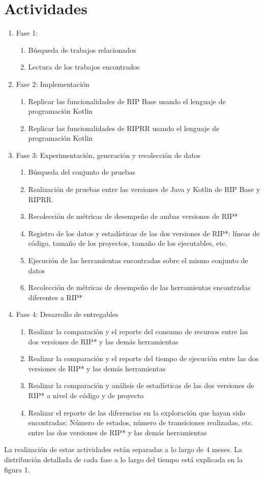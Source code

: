 \documentclass[conference]{IEEEtran}
\begin{document}
\section{Actividades}
	\begin{enumerate}
		\item Fase 1: 
		\begin{enumerate}
			\item Búsqueda de trabajos relacionados
			\item Lectura de los trabajos encontrados
		\end{enumerate}
		\item Fase 2: Implementación
		\begin{enumerate}
			\item Replicar las funcionalidades de RIP Base usando el lenguaje de programación Kotlin
			\item Replicar las funcionalidades de RIPRR usando el lenguaje de programación Kotlin
		\end{enumerate}
		\item Fase 3: Experimentación, generación y recolección de datos
		\begin{enumerate}
			\item Búsqueda del conjunto de pruebas
			\item Realización de pruebas entre las versiones de Java y Kotlin de RIP Base y RIPRR. 
			\item Recolección de métricas de desempeño de ambas versiones de RIP*
			\item Registro de los datos y estadísticas de las dos versiones de RIP*: líneas de código, tamaño de los proyectos, tamaño de los ejecutables, etc.\
			\item Ejecución de las herramientas encontradas sobre el mismo conjunto de datos
			\item Recolección de métricas de desempeño de las herramientas encontradas diferentes a RIP*
		\end{enumerate}
		\item Fase 4: Desarrollo de entregables
		\begin{enumerate}
			\item Realizar la comparación y el reporte del consumo de recursos entre las dos versiones de RIP* y las demás herramientas
			\item Realizar la comparación y el reporte del tiempo de ejecución entre las dos versiones de RIP* y las demás herramientas
			\item Realizar la comparación y análisis de estadísticas de las dos versiones de RIP* a nivel de código y de proyecto
			\item Realizar el reporte de las diferencias en la exploración que hayan sido encontradas: Número de estados, número de transiciones realizadas, etc. entre las dos versiones de RIP* y las demás herramientas
		\end{enumerate}
	\end{enumerate}
La realización de estas actividades están separadas a lo largo de 4 meses. La distribución detallada de cada fase a lo largo del tiempo está explicada en la figura 1.
\end{document}
